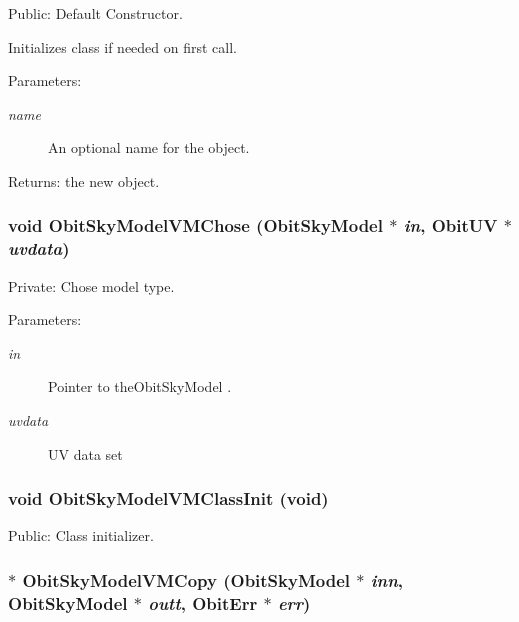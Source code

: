 Public: Default Constructor. 

Initializes class if needed on first call. \begin{Desc}
\item[Parameters:]
\begin{description}
\item[{\em name}]An optional name for the object. \end{description}
\end{Desc}
\begin{Desc}
\item[Returns:]the new object. \end{Desc}
\subsubsection{\setlength{\rightskip}{0pt plus 5cm}void Obit\-Sky\-Model\-VMChose ({\bf Obit\-Sky\-Model} $\ast$ {\em in}, {\bf Obit\-UV} $\ast$ {\em uvdata})}\label{ObitSkyModelVM_8c_a9}


Private: Chose model type. 

\begin{Desc}
\item[Parameters:]
\begin{description}
\item[{\em in}]Pointer to the\-Obit\-Sky\-Model . \item[{\em uvdata}]UV data set \end{description}
\end{Desc}
\subsubsection{\setlength{\rightskip}{0pt plus 5cm}void Obit\-Sky\-Model\-VMClass\-Init (void)}\label{ObitSkyModelVM_8c_a20}


Public: Class initializer. 

\subsubsection{$\ast$ Obit\-Sky\-Model\-VMCopy ({\bf Obit\-Sky\-Model} $\ast$ {\em inn}, {\bf Obit\-Sky\-Model} $\ast$ {\em outt}, {\bf Obit\-Err} $\ast$ {\em err})}\label{ObitSkyModelVM_8c_a14}


